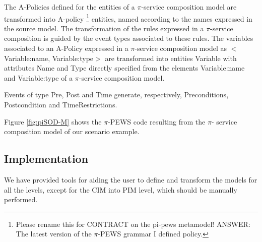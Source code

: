 
The A-Policies defined for the entities of a $\pi$-service composition model are transformed into {\sf A-policy}
\footnote{\color{red} Please rename this for CONTRACT on the pi-pews metamodel!
\color{blue} ANSWER: The latest version of the $\pi$-PEWS grammar I defined
policy.} entities, named according to the names expressed in the source model.
The transformation of the rules expressed in a $\pi$-service composition is guided by the event types associated to these rules. 
The variables associated to an A-Policy expressed in a $\pi$-service composition model as {\sf $<$Variable:name, Variable:type$>$} are transformed into entities  {\sf Variable} with attributes {\sf Name} and {\sf Type} directly specified from the elements {\sf Variable:name} and {\sf Variable:type} of a $\pi$-service composition model.

Events of type {\sf Pre}, {\sf Post} and {\sf Time} generate, respectively, {\sf Preconditions}, {\sf Postcondition} and {\sf TimeRestrictions}.

\begin{example}\label{ex:toPublicMusicT6}
Figure \ref{fig:piSOD-M} shows the $\pi$-PEWS code resulting from the $\pi$- service composition model  of our scenario example.
\end{example}


\subsection{Implementation}
We have provided tools for aiding the user to define and transform the models for all the levels, except for the CIM into PIM level, which should be manually performed.

